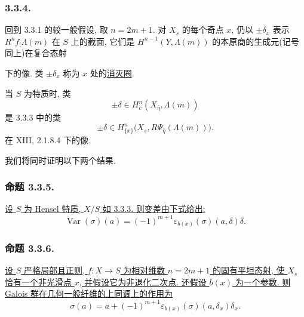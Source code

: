 \subsubsection*{3.3.4.}
回到 3.3.1 的较一般假设, 取 $n=2m+1$. 对 $X_s$ 的每个奇点 $x$, 仍以 $\pm\delta_x$ 表示 $R^nf_!\Lambda(m)$ 在 $S$ 上的截面, 它们是 $H^{n-1}(Y,\Lambda(m))$ 的本原商的生成元(记号同上)在复合态射
\begin{center}
\end{center}
下的像. 类 $\pm\delta_x$ 称为 $x$ 处的\underline{消灭圈}.

当 $S$ 为特质时, 类
\[
\pm\delta\in H_c^n(X_{\bar\eta},\Lambda(m))
\]
是 3.3.3 中的类
\[
\pm\delta\in
H^n_{\{x\}}\bigl(X_s,R\Psi_{\bar\eta}(\Lambda(m))\bigr).
\]
在 XIII, 2.1.8.4 下的像.

我们将同时证明以下两个结果.

\subsubsection*{命题 3.3.5.}
\underline{设 $S$ 为 Hensel 特质, $X/S$ 如 3.3.3. 则变差由下式给出:}
\[
\operatorname{Var}(\sigma)(a)
=(-1)^{m+1}\varepsilon_{b(x)}(\sigma)(a,\delta)\delta.
\]

\subsubsection*{命题 3.3.6.}
\underline{设 $S$ 严格局部且正则, $f:X\to S$ 为相对维数 $n=2m+1$ 的固有平坦态射, 使 $X_s$ 恰有一个非光滑点 $x$, 并假设它为非退化二次点. 还假设 $b(x)$ 为一个参数. 则 Galois 群在几何一般纤维的上同调上的作用为}
\[
\sigma(a)=a+(-1)^{m+1}
\varepsilon_{b(x)}(\sigma)(a,\delta_x)\delta_x.
\]